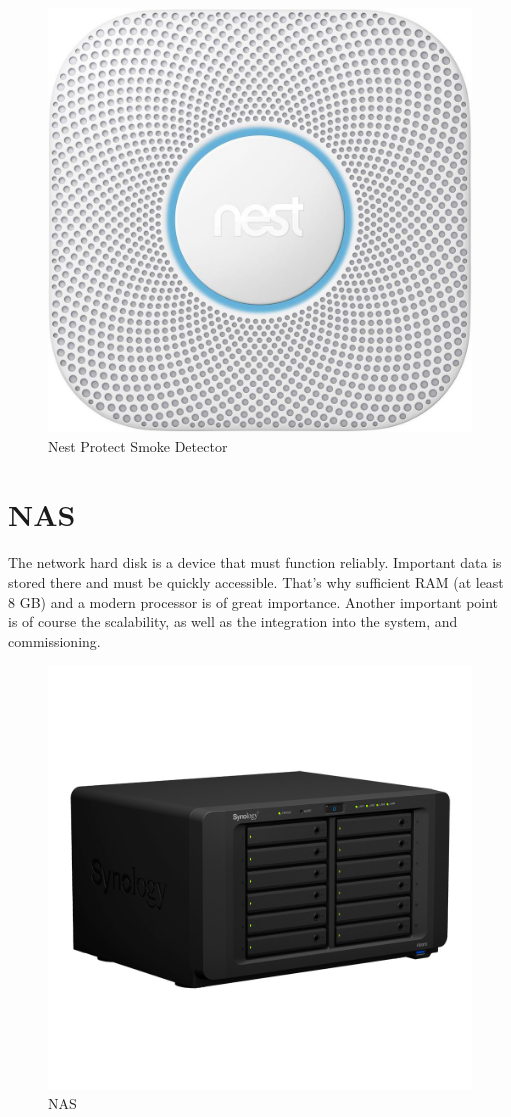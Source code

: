 \begin{figure}[h]
	\centering
	\includegraphics[width=.4\textwidth]{images/CostAnalysis/NestProtect} 
	\caption[Nest Protect Smoke Detector]{Nest Protect Smoke Detector\footnotemark}
	\label{fig:smokeDetection}
\end{figure}
\section{NAS }
The network hard disk is a device that must function reliably. Important data is stored there and must be quickly accessible. That's why sufficient RAM (at least 8 GB) and a modern processor is of great importance. Another important point is of course the scalability, as well as the integration into the system, and commissioning.
\clearpage
\begin{figure}[h]
	\centering
	\includegraphics[width=.6\textwidth]{images/CostAnalysis/synologyFS1018} 
	\caption[NAS]{NAS\footnotemark}
	\label{fig:nas}
\end{figure}

